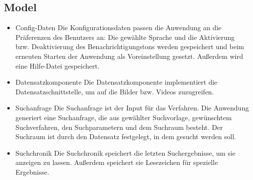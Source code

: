 \subsection{Model}
\begin{itemize}
\item Config-Daten\newline
Die Konfigurationsdaten passen die Anwendung an die Präferenzen des Benutzers an: Die gewählte Sprache und die Aktivierung bzw. Deaktivierung des Benachrichtigungstons werden gespeichert und beim erneuten Starten der Anwendung als Voreinstellung gesetzt. Außerdem wird eine Hilfe-Datei gespeichert.
\item Datensatzkomponente\newline
Die Datensatzkomponente implementiert die Datensatzschnittstelle, um auf die Bilder bzw. Videos zuzugreifen.
\item Suchanfrage\newline
Die Suchanfrage ist der Input für das Verfahren. Die Anwendung generiert eine Suchanfrage, die aus gewählter Suchvorlage, gewünschtem Suchverfahren, den Suchparametern und dem Suchraum besteht. Der Suchraum ist durch den Datensatz festgelegt, in dem gesucht werden soll.
\item Suchchronik\newline
Die Suchchronik speichert die letzten Suchergebnisse, um sie anzeigen zu lassen. Außerdem speichert sie Lesezeichen für spezielle Ergebnisse.
\end{itemize}

